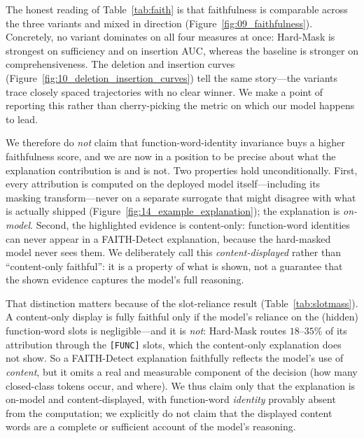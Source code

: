 \documentclass[10pt,twocolumn]{article}
\begin{document}
The honest reading of Table~\ref{tab:faith} is that faithfulness is comparable across the three variants and mixed in direction (Figure~\ref{fig:09_faithfulness}). Concretely, no variant dominates on all four measures at once: Hard-Mask is strongest on sufficiency and on insertion AUC, whereas the baseline is stronger on comprehensiveness. The deletion and insertion curves (Figure~\ref{fig:10_deletion_insertion_curves}) tell the same story---the variants trace closely spaced trajectories with no clear winner. We make a point of reporting this rather than cherry-picking the metric on which our model happens to lead.

We therefore do \emph{not} claim that function-word-identity invariance buys a higher faithfulness score, and we are now in a position to be precise about what the explanation contribution is and is not. Two properties hold unconditionally. First, every attribution is computed on the deployed model itself---including its masking transform---never on a separate surrogate that might disagree with what is actually shipped (Figure~\ref{fig:14_example_explanation}); the explanation is \emph{on-model}. Second, the highlighted evidence is content-only: function-word identities can never appear in a FAITH-Detect explanation, because the hard-masked model never sees them. We deliberately call this \emph{content-displayed} rather than ``content-only faithful'': it is a property of what is shown, not a guarantee that the shown evidence captures the model's full reasoning.

That distinction matters because of the slot-reliance result (Table~\ref{tab:slotmass}). A content-only display is fully faithful only if the model's reliance on the (hidden) function-word slots is negligible---and it is \emph{not}: Hard-Mask routes $18$--$35\%$ of its attribution through the \texttt{[FUNC]} slots, which the content-only explanation does not show. So a FAITH-Detect explanation faithfully reflects the model's use of \emph{content}, but it omits a real and measurable component of the decision (how many closed-class tokens occur, and where). We thus claim only that the explanation is on-model and content-displayed, with function-word \emph{identity} provably absent from the computation; we explicitly do not claim that the displayed content words are a complete or sufficient account of the model's reasoning.
\end{document}
